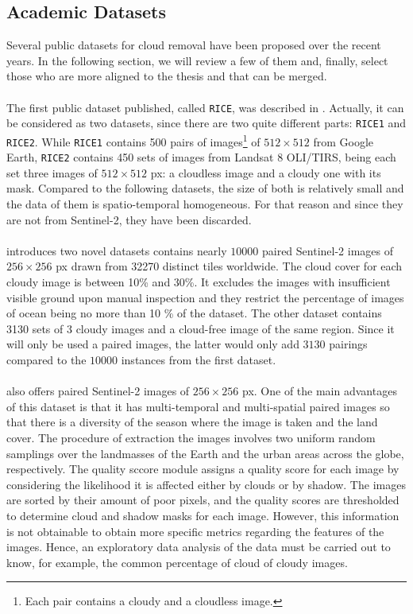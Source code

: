 \documentclass[../main.tex]{subfiles}
\begin{document}
\subsection{Academic Datasets}
Several public datasets for cloud removal have been proposed over the recent years. In the following section, we will review a few of them and, finally, select those who are more aligned to the thesis and that can be merged.
\\
\\
The first public dataset published, called \texttt{RICE}, was described in \cite{rice}. Actually, it can be considered as two datasets, since there are two quite different parts: \texttt{RICE1} and \texttt{RICE2}. While \texttt{RICE1} contains 500 pairs of images\footnote{Each pair contains a cloudy and a cloudless image.} of $512 \times 512$ from Google Earth, \texttt{RICE2} contains 450 sets of images from Landsat 8 OLI/TIRS, being each set three images of $512 \times 512$ px: a cloudless image and a cloudy one with its mask. Compared to the following datasets, the size of both is relatively small and the data of them is spatio-temporal homogeneous. For that reason and since they are not from Sentinel-2, they have been discarded.
\\
\\
\cite{sarukkai2019cloud} introduces two novel datasets contains nearly $10000$ paired Sentinel-2 images of $256 \times 256$ px	drawn from 32270 distinct tiles worldwide. The cloud cover for each cloudy image is between 10\% and 30\%. It excludes the images with insufficient visible ground upon manual inspection and they restrict the percentage of images of ocean being no more than 10 \% of the dataset. The other dataset contains 3130 sets of 3 cloudy images and a cloud-free image of the same region. Since it will only be used a paired images, the latter would only add $3130$ pairings compared to the $10000$ instances from the first dataset.
\\
\\
\cite{sen12mscr} also offers paired Sentinel-2 images of  $256 \times 256$ px. One of the main advantages of this dataset is that it has multi-temporal and multi-spatial paired images so that there is a diversity of the season where the image is taken and the land cover.
The procedure of extraction the images involves two uniform random samplings over the landmasses of the Earth and the urban areas across the globe, respectively. The quality sccore module assigns a quality score for each image by considering the likelihood it is affected either by clouds or by shadow. The images are sorted by their amount of poor pixels, and the quality scores are thresholded to determine cloud and shadow masks for each image. However, this information is not obtainable to obtain more specific metrics regarding the features of the images. Hence, an exploratory data analysis of the data must be carried out to know, for example, the common percentage of cloud of cloudy images.
\end{document}
